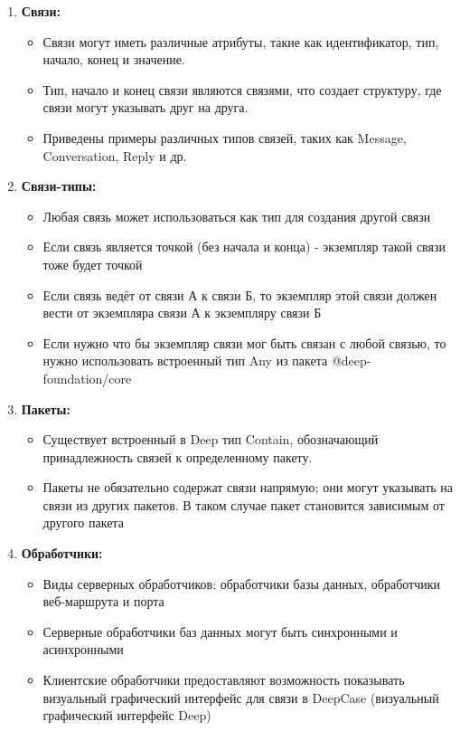 \documentclass{article}
\begin{document}
\begin{enumerate}
  \item \textbf{Связи:}
        \begin{itemize}
          \item Связи могут иметь различные атрибуты, такие как идентификатор,
                тип, начало, конец и значение.
          \item Тип, начало и конец связи являются связями, что создает
                структуру, где связи могут указывать друг на друга.
          \item Приведены примеры различных типов связей, таких как Message,
                Conversation, Reply и др.
        \end{itemize}

  \item \textbf{Связи-типы:}
        \begin{itemize}
          \item Любая связь может использоваться как тип для создания другой
                связи
          \item Если связь является точкой (без начала и конца) - экземпляр
                такой связи тоже будет точкой
          \item Если связь ведёт от связи А к связи Б, то экземпляр этой связи
                должен вести от экземпляра связи А к экземпляру связи Б
          \item Если нужно что бы экземпляр связи мог быть связан с любой
                связью,
                то нужно использовать встроенный тип Any из пакета
                @deep-foundation/core
        \end{itemize}

  \item \textbf{Пакеты:}
        \begin{itemize}
          \item Существует встроенный в Deep тип Contain, обозначающий
                принадлежность связей к определенному пакету.
          \item Пакеты не обязательно содержат связи напрямую; они могут
                указывать на связи из других пакетов. В таком случае пакет становится зависимым от другого пакета
        \end{itemize}

  \item \textbf{Обработчики:}
        \begin{itemize}
          \item Виды серверных обработчиков: обработчики базы данных,
                обработчики веб-маршрута и порта
          \item Серверные обработчики баз данных могут быть синхронными и
                асинхронными
          \item Клиентские обработчики предоставляют возможность показывать
                визуальный графический интерфейс для связи в DeepCase
                (визуальный графический
                интерфейс Deep)
        \end{itemize}


\end{enumerate}
\end{document}
